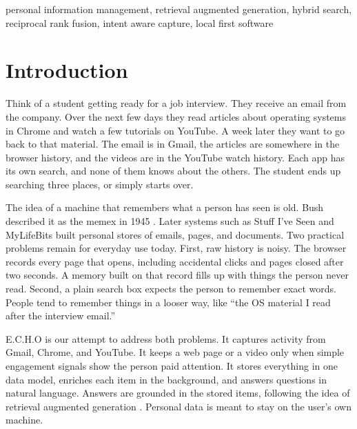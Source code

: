\documentclass[conference]{IEEEtran}
\begin{document}
\begin{IEEEkeywords}
personal information management, retrieval augmented generation, hybrid search, reciprocal rank fusion, intent aware capture, local first software
\end{IEEEkeywords}

\section{Introduction}
Think of a student getting ready for a job interview. They receive an email from the company. Over the next few days they read articles about operating systems in Chrome and watch a few tutorials on YouTube. A week later they want to go back to that material. The email is in Gmail, the articles are somewhere in the browser history, and the videos are in the YouTube watch history. Each app has its own search, and none of them knows about the others. The student ends up searching three places, or simply starts over.

The idea of a machine that remembers what a person has seen is old. Bush described it as the memex in 1945 \cite{b1}. Later systems such as Stuff I've Seen \cite{b2} and MyLifeBits \cite{b3} built personal stores of emails, pages, and documents. Two practical problems remain for everyday use today. First, raw history is noisy. The browser records every page that opens, including accidental clicks and pages closed after two seconds. A memory built on that record fills up with things the person never read. Second, a plain search box expects the person to remember exact words. People tend to remember things in a looser way, like ``the OS material I read after the interview email.''

E.C.H.O is our attempt to address both problems. It captures activity from Gmail, Chrome, and YouTube. It keeps a web page or a video only when simple engagement signals show the person paid attention. It stores everything in one data model, enriches each item in the background, and answers questions in natural language. Answers are grounded in the stored items, following the idea of retrieval augmented generation \cite{b4}. Personal data is meant to stay on the user's own machine.
\end{document}
